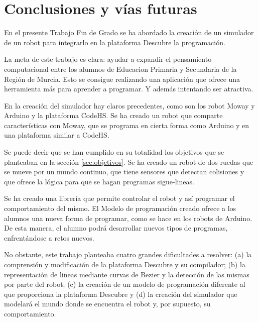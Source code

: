 \chapter{Conclusiones y vías futuras}
\label{conslusiones}


En el presente Trabajo Fin de Grado se ha abordado la creación de un simulador de un robot para integrarlo en la plataforma Descubre la programación. 

La meta de este trabajo es clara: ayudar a expandir el pensamiento computacional entre los alumnos de Educacion Primaria y Secundaria de la Región de Murcia. Esto se consigue realizando una aplicación que ofrece una herramienta más para aprender a programar. Y además intentando ser atractiva. 

En la creación del simulador hay claros {\color{red}precedentes}, como son los robot Moway y Arduino y la plataforma CodeHS. Se ha creado un robot que comparte características con Moway, que se programa en cierta forma como Arduino y en una plataforma similar a CodeHS. 

Se puede decir que se han cumplido en su totalidad los objetivos que se planteaban en la sección \ref{sec:objetivos}. Se ha creado un robot de dos ruedas que se mueve por un mundo continuo, que tiene sensores que detectan colisiones y que ofrece la lógica para que se hagan programas sigue-lineas. 

Se ha creado una librería que permite controlar el robot y así programar el comportamiento del mismo. El Modelo de programación creado ofrece a los alumnos una nueva forma de programar, como se hace en los robots de Arduino. De esta manera, el alumno podrá desarrollar nuevos tipos de programas, enfrentándose a retos nuevos. 

No obstante, este trabajo planteaba cuatro grandes dificultades a resolver: (a) la comprensión y modificación de la plataforma Descubre y su compilador; (b) la representación de lineas mediante curvas de Bezier y la detección de las mismas por parte del robot; (c) la creación de un modelo de programación diferente al que proporciona la plataforma Descubre y (d) la creación del simulador que modelará el mundo donde se encuentra el robot y, por supuesto, su comportamiento.

